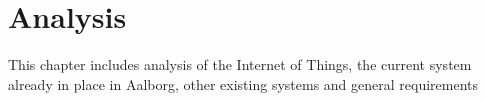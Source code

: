 
\usepackage[draft]{fixme}				%
\usepackage[disable]{todonotes}					%
\newcommand{\bycykel}{Aalborg Bycykel }

	
	\newpage\null\thispagestyle{empty}\newpage
	
	\addtocounter{page}{4}
	\newpage\null\thispagestyle{empty}\newpage
	
	\newpage\null\thispagestyle{empty}\newpage
	
	\label{startoftoc}
	\begin{KeepFromToc}
		\tableofcontents
		\newpage\null\thispagestyle{empty}\newpage
		\newpage\null\thispagestyle{empty}\newpage
		\todototoc
		\listoftodos
	\end{KeepFromToc}
	\label{endoftoc}
	
	
	\chapter{Analysis}
	This chapter includes analysis of the Internet of Things, the current system already in place in Aalborg, other existing systems and general requirements
	
	
	
	
	
	
	
	\afterpage{\thispagestyle{empty}}

	
	
	\label{lastpagewithoutappendix}

	\appendix
	
	\cleardoublepage

